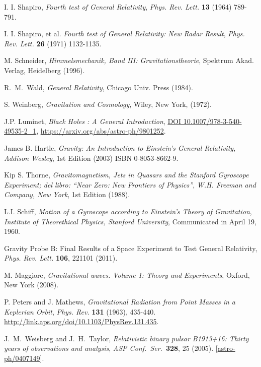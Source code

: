 \begin{thebibliography}{99}
 I. I. Shapiro,  {\em Fourth test of General Relativity}, {\sl Phys. Rev. Lett.} {\bf 13} (1964) 789-791.

 I. I. Shapiro, et al. {\em Fourth test of General Relativity: New Radar Result}, {\sl Phys. Rev. Lett.} {\bf 26} (1971) 1132-1135.

M. Schneider, {\em Himmelsmechanik, Band III:
Gravitationstheorie}, Spektrum Akad. Verlag, Heidelberg (1996).



 R.~M.~Wald, {\em General Relativity},  Chicago Univ. Press (1984).

 S. Weinberg, {\em Gravitation and Cosmology}, Wiley, New
York, (1972).

 J.P. Luminet, {\em Black Holes : A General Introduction}, \href{http://dx.doi.org/10.1007/978-3-540-49535-2\_1}{DOI 10.1007/978-3-540-49535-2\_1}, \url{https://arxiv.org/abs/astro-ph/9801252}.






James B. Hartle, {\it Gravity: An Introduction to Einstein's General Relativity},
{\sl Addison Wesley}, 1st Edition (2003) ISBN 0-8053-8662-9.

Kip S. Thorne, {\it Gravitomagnetism, Jets in Quasars and the Stanford Gyroscope Experiment; del libro: ``Near Zero: New Frontiers of Physics''},
{\sl W.H. Freeman and Company, New York}, 1st Edition (1988).

L.I. Schiff, {\it Motion of a Gyroscope according to Einstein's Theory of Gravitation},
{\sl Institute of Theorethical Physics, Stanford University}, Communicated in April 19, 1960.



Gravity Probe B: Final Results of a Space Experiment to Test General Relativity, {\it Phys. Rev. Lett.} {\bf 106}, 221101 (2011).

 M. Maggiore, {\em  Gravitational waves. Volume 1: Theory and Experiments}, Oxford, New York (2008).

P. Peters and J. Mathews, {\em Gravitational Radiation from Point Masses in a Keplerian Orbit}, {\sl Phys. Rev.} {\bf 131} (1963), 435-440. \url{http://link.aps.org/doi/10.1103/PhysRev.131.435}.

 J.~M.~Weisberg and J.~H.~Taylor, {\em Relativistic binary pulsar B1913+16: Thirty years of observations and analysis}, {\sl ASP Conf.\ Ser.}\  {\bf 328}, 25 (2005). [\href{http://arxiv.org/abs/astro-ph/0407149}{astro-ph/0407149}].


\end{thebibliography}
